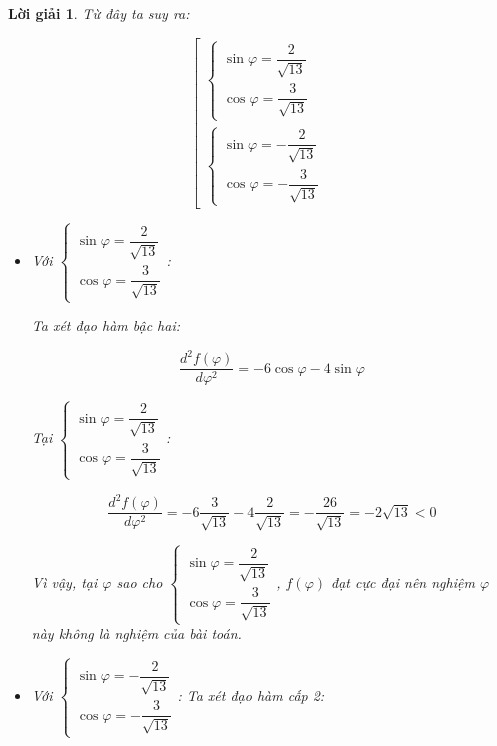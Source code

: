 \documentclass[14pt, a4paper]{article}
\theoremstyle{sltheorem}
\theoremstyle{soltheorem}
\newtheorem*{loigiai}{Lời giải}
\begin{document}
\begin{loigiai}
        Từ đây ta suy ra:

        \begin{equation*}
            \left [\begin{array}{l} \begin{cases} \sin \varphi = \dfrac{2}{\sqrt{13}} \\ \cos \varphi = \dfrac{3}{\sqrt{13}} \end{cases} \\ \begin{cases} \sin \varphi = -\dfrac{2}{\sqrt{13}} \\ \cos \varphi = -\dfrac{3}{\sqrt{13}} \end{cases} \end{array} \right.
        \end{equation*}

        \begin{itemize}
            \item Với $\begin{cases} \sin \varphi = \dfrac{2}{\sqrt{13}} \\ \cos \varphi = \dfrac{3}{\sqrt{13}} \end{cases}$:
            
            Ta xét đạo hàm bậc hai:

            \begin{equation*}
                \dfrac{d^2 f(\varphi)}{d \varphi^2} = - 6 \cos \varphi - 4 \sin \varphi
            \end{equation*}

            Tại $\begin{cases} \sin \varphi = \dfrac{2}{\sqrt{13}} \\ \cos \varphi = \dfrac{3}{\sqrt{13}} \end{cases}$:

            \begin{equation*}
                \dfrac{d^2 f(\varphi)}{d \varphi^2} = -6 \dfrac{3}{\sqrt{13}} - 4 \dfrac{2}{\sqrt{13}} = -\dfrac{26}{\sqrt{13}}=-2\sqrt{13} < 0
            \end{equation*}

            Vì vậy, tại $\varphi$ sao cho $\begin{cases} \sin \varphi = \dfrac{2}{\sqrt{13}} \\ \cos \varphi = \dfrac{3}{\sqrt{13}} \end{cases}$, $f(\varphi)$ đạt cực đại nên nghiệm $\varphi$ này không là nghiệm của bài toán.

            \item Với $\begin{cases} \sin \varphi = -\dfrac{2}{\sqrt{13}} \\ \cos \varphi = -\dfrac{3}{\sqrt{13}} \end{cases}$:
            Ta xét đạo hàm cấp 2:
            

\end{itemize}
\end{loigiai}
\end{document}
